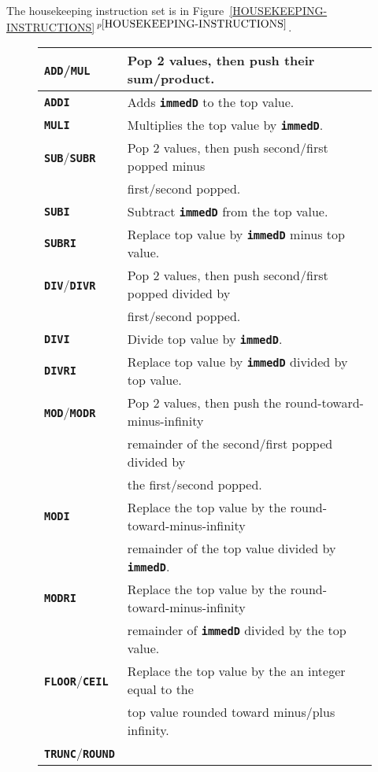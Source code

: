 \documentclass[12pt]{article}
\makeatletter
\newcommand{\TT}[1]{{\tt \bfseries #1}}
\newcommand{\ttkey}[1]{\TT{#1}\index{#1@{\tt #1}}}
\newcommand{\itemref}[1]{\ref{#1}$\,^{p\pageref{#1}}$}
\newlength{\figurewidth}
\newenvironment{boxedfigure}[1][!btp]%
	{\begin{figure*}[#1]
	 \begin{lrbox}{\figurebox}
	 \begin{minipage}{\figurewidth}

	 \vspace*{1ex}}%
	{
	 \vspace*{1ex}

	 \end{minipage}
	 \end{lrbox}

	 \centering
	 \fbox{\hspace*{0.1in}\usebox{\figurebox}\hspace*{0.1in}}
	 \end{figure*}}
\makeatother
\begin{document}
The housekeeping instruction set is in
Figure~\itemref{HOUSEKEEPING-INSTRUCTIONS}.

\pagebreak


\begin{boxedfigure}

\begin{center}
\begin{tabular}{|l|l|}
\hline
\ttkey{ADD}/\ttkey{MUL}
    & Pop 2 values, then push their sum/product.
\\\hline
\ttkey{ADDI}
    & Adds \TT{immedD} to the top value.
\\\hline
\ttkey{MULI}
    & Multiplies the top value by \TT{immedD}.
\\\hline
\ttkey{SUB}/\ttkey{SUBR}
    & Pop 2 values, then push second/first popped minus \\
    & first/second popped.
\\\hline
\ttkey{SUBI}
    & Subtract \TT{immedD} from the top value.
\\\hline
\ttkey{SUBRI}
    & Replace top value by \TT{immedD} minus top value.
\\\hline
\ttkey{DIV}/\ttkey{DIVR}
    & Pop 2 values, then push second/first popped divided by\\
    & first/second popped.
\\\hline
\ttkey{DIVI}
    & Divide top value by \TT{immedD}.
\\\hline
\ttkey{DIVRI}
    & Replace top value by \TT{immedD} divided by top value.
\\\hline
\ttkey{MOD}/\ttkey{MODR}
    & Pop 2 values, then push the round-toward-minus-infinity \\
    & remainder of the second/first popped divided by \\
    & the first/second popped.
\\\hline
\ttkey{MODI}
    & Replace the top value by the round-toward-minus-infinity \\
    & remainder of the top value divided by \TT{immedD}.
\\\hline
\ttkey{MODRI}
    & Replace the top value by the round-toward-minus-infinity \\
    & remainder of \TT{immedD} divided by the top value.
\\\hline
\ttkey{FLOOR}/\ttkey{CEIL}
    & Replace the top value by the an integer equal to the \\
    & top value rounded toward minus/plus infinity.
\\\hline
\ttkey{TRUNC}/\ttkey{ROUND}

\end{tabular}
\end{center}
\end{boxedfigure}
\end{document}
